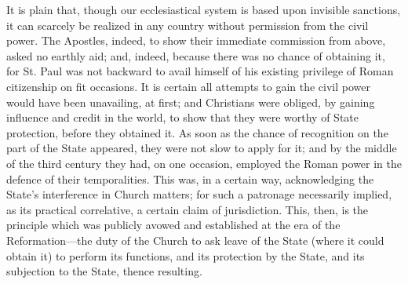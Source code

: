 It is plain that, though our
ecclesiastical system is based upon invisible sanctions, it can
scarcely be realized in any country without permission from the civil
power. The Apostles, indeed, to show their immediate commission from
above, asked no earthly aid; and, indeed, because there was no chance
of obtaining it, for St. Paul was not backward to avail himself of his
existing privilege of Roman citizenship on fit occasions. It is
certain all attempts to gain the civil power would have been
unavailing, at first; and Christians were obliged, by gaining
influence and credit in the world, to show that they were worthy of
State protection, before they obtained it. As soon as the chance of
recognition on the part of the State appeared, they were not slow to
apply for it; and by the middle of the third century they had, on one
occasion, employed the Roman power in the defence of their
temporalities. This was, in a certain way, acknowledging the State's
interference in Church matters; for such a patronage necessarily
implied, as its practical correlative, a certain claim of
jurisdiction. This, then, is the principle which was publicly avowed
and established at the era of the Reformation—the duty of the Church
to ask leave of the State (where it could obtain it) to perform its
functions, and its protection by the State, and its subjection to the
State, thence resulting.

